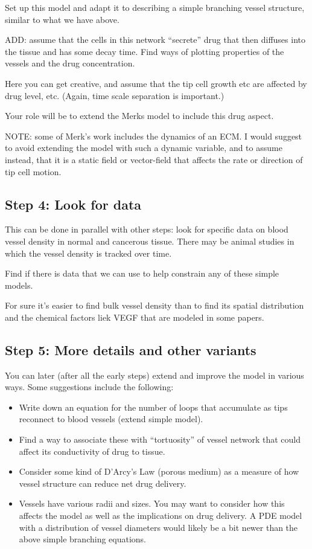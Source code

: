 Set up this model and adapt it to describing a simple branching vessel structure, similar to what we have above.

ADD: assume that the cells in this network ``secrete'' drug that then diffuses into the tissue and has some decay time. Find ways of plotting properties of the vessels and the drug concentration. 

Here you can get creative, and assume that the tip cell growth etc are affected by drug level, etc. (Again, time scale separation is important.) 

Your role will be to extend the Merks model to include this drug aspect.

NOTE: some of Merk's work includes the dynamics of an ECM. I would suggest to avoid extending the model with such a dynamic variable, and to assume instead, that it is a static field or vector-field that affects the rate or direction of tip cell motion.

\subsection{Step 4: Look for data}

This can be done in parallel with other steps: look for specific data on blood vessel density in normal and cancerous tissue. There may be animal studies in which the vessel density is tracked over time.

Find if there is data that we can use to help constrain any of these simple models.

For sure it's easier to find bulk vessel density than to find its spatial distribution and the chemical factors liek VEGF that are modeled in some papers.


\subsection{Step 5: More details and other variants}

You can later (after all the early steps) extend and improve the model in various ways. Some suggestions include the following:

\begin{itemize}
    \item Write down an equation for the number of loops that accumulate as tips reconnect to blood vessels (extend simple model).
    \item Find a way to associate these with ``tortuosity'' of vessel network that could affect its conductivity of drug to tissue.
    \item Consider some kind of D'Arcy's Law (porous medium) as a measure of how vessel structure can reduce net drug delivery.
    \item Vessels have various radii and sizes. You may want to consider how this affects the model as well as the implications on drug delivery. A PDE model with a distribution of vessel diameters would likely be a bit newer than the above simple branching equations.
\end{itemize}



	

	

	
	

